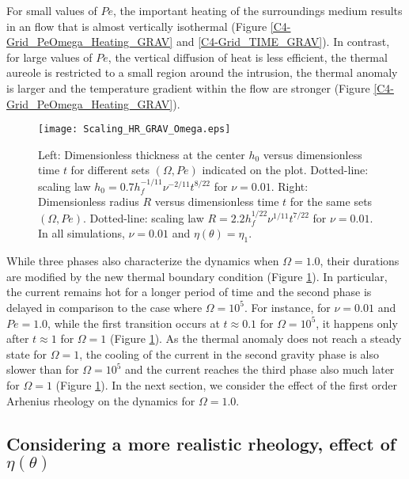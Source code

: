For small  values of $Pe$,  the important heating of  the surroundings
medium results in an flow that is almost vertically isothermal (Figure
\ref{C4-Grid_PeOmega_Heating_GRAV}  and \ref{C4-Grid_TIME_GRAV}).   In
contrast, for large values of $Pe$,  the vertical diffusion of heat is
less efficient,  the thermal aureole  is restricted to a  small region
around  the  intrusion,   the  thermal  anomaly  is   larger  and  the
temperature   gradient   within   the  flow   are   stronger   (Figure
\ref{C4-Grid_PeOmega_Heating_GRAV}).
\begin{figure}[h!]
  \begin{center}
    \graphicspath{ {/Users/thorey/Documents/These/Projet/Refroidissement/Skin_Model/Figure/Figure_Heating/} }
    \texttt{[image: Scaling\_HR\_GRAV\_Omega.eps]}
    \caption{Left: Dimensionless thickness at  the center $h_0$ versus
      dimensionless   time  $t$   for  different   sets  $(\Omega,Pe)$
      indicated    on   the    plot.     Dotted-line:   scaling    law
      $h_0=  0.7h_f^{-1/11}\nu^{-2/11}t^{8/22}$  for   $\nu  =  0.01$.
      Right: Dimensionless  radius $R$  versus dimensionless  time $t$
      for  the  same  sets $(\Omega,Pe)$.   Dotted-line:  scaling  law
      $R= 2.2h_f^{1/22}\nu^{1/11}t^{7/22}$  for $\nu = 0.01$.   In all
      simulations, $\nu=0.01$ and $\eta(\theta)=\eta_1$.}
    \label{C4-Scaling_HR_GRAV_Omega}
  \end{center}
\end{figure}

While three  phases also characterize the  dynamics when $\Omega=1.0$,
their durations  are modified  by the  new thermal  boundary condition
(Figure \ref{C4-Scaling_HR_GRAV_Omega}).   In particular,  the current
remains  hot for  a longer  period  of time  and the  second phase  is
delayed in comparison to the case where $\Omega =10^5$.  For instance,
for  $\nu=0.01$ and  $Pe=1.0$, while  the first  transition occurs  at
$t \approx 0.1$ for $\Omega=10^5$,  it happens only after $t\approx 1$
for  $\Omega=1$   (Figure  \ref{C4-Scaling_HR_GRAV_Omega}).    As  the
thermal  anomaly does  not reach  a steady  state for  $\Omega=1$, the
cooling of the current in the second gravity phase is also slower than
for $\Omega=10^5$  and the current  reaches the third phase  also much
later for $\Omega=1$  (Figure \ref{C4-Scaling_HR_GRAV_Omega}).  In the
next  section, we  consider the  effect  of the  first order  Arhenius
rheology on the dynamics for $\Omega=1.0$.

\subsection{Considering   a  more   realistic   rheology,  effect   of
  $\eta(\theta)$}
\label{C4-sec:cons-more-real-1}
 
